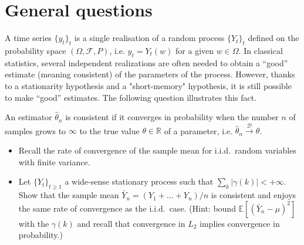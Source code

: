 \documentclass[11pt]{article}
\begin{document}
\section{General questions}

A time series $\{y_t\}_t$ is a single realisation of a random process $\{Y_t\}_t$ defined on the probability space $(\Omega, \mathcal{F}, P)$, i.e. $y_t = Y_t(w)$ for a given $w\in\Omega$.
In classical statistics, several independent realizations are often needed to obtain a ``good'' estimate (meaning consistent) of the parameters of the process.
However, thanks to a stationarity hypothesis and a "short-memory" hypothesis, it is still possible to make ``good'' estimates.
The following question illustrates this fact.

\begin{exercise}
An estimator $\hat{\theta}_n$ is consistent if it converges in probability when the number $n$ of samples grows to $\infty$ to the true value $\theta\in\mathbb{R}$ of a parameter, i.e. $\hat{\theta}_n \xrightarrow{\mathcal{D}} \theta$.

\begin{itemize}
    \item Recall the rate of convergence of the sample mean for i.i.d.\ random variables with finite variance.
    \item Let $\{Y_t\}_{t\geq 1}$ a wide-sense stationary process such that $\sum_k |\gamma (k)| < +\infty$. 
    Show that the sample mean $\bar{Y}_n = (Y_1+\dots+Y_n)/n$ is consistent and enjoys the same rate of convergence as the i.i.d.\ case. (Hint: bound $\mathbb{E}[(\bar{Y}_n-\mu)^2]$ with the $\gamma (k)$ and recall that convergence in $L_2$ implies convergence in probability.)
\end{itemize}

\end{exercise}
\end{document}
